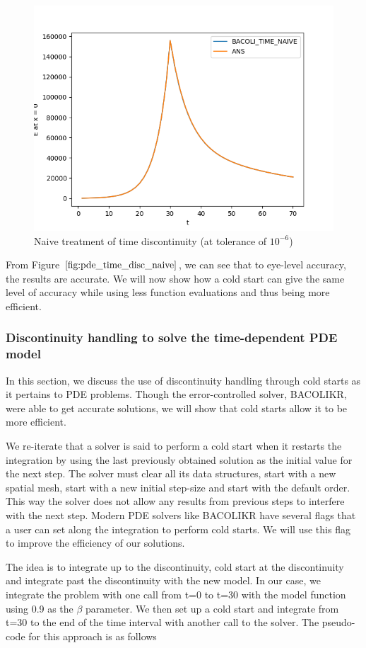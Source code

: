 \documentclass{article}
\begin{document}
\begin{figure}[H]
\centering
\includegraphics[width=0.7\linewidth]{./figures/pde_time_disc_naive}
\caption{Naive treatment of time discontinuity (at tolerance of $10^{-6}$)}
\label{fig:pde_time_disc_naive}
\end{figure}

From Figure $\ref{fig:pde_time_disc_naive}$, we can see that to eye-level accuracy, the results are accurate. We will now show how a cold start can give the same level of accuracy while using less function evaluations and thus being more efficient.

\subsubsection{Discontinuity handling to solve the time-dependent PDE model}
\label{subsubsection:pde_time_disc_hand}
In this section, we discuss the use of discontinuity handling through cold starts as it pertains to PDE problems. Though the error-controlled solver, BACOLIKR, were able to get accurate solutions, we will show that cold starts allow it to be more efficient.

We re-iterate that a solver is said to perform a cold start when it restarts the integration by using the last previously obtained solution as the initial value for the next step. The solver must clear all its data structures, start with a new spatial mesh, start with a new initial step-size and start with the default order. This way the solver does not allow any results from previous steps to interfere with the next step. Modern PDE solvers like BACOLIKR have several flags that a user can set along the integration to perform cold starts. We will use this flag to improve the efficiency of our solutions.

The idea is to integrate up to the discontinuity, cold start at the discontinuity and integrate past the discontinuity with the new model. In our case, we integrate the problem with one call from t=0 to t=30 with the model function using 0.9 as the $\beta$ parameter. We then set up a cold start and integrate from t=30 to the end of the time interval with another call to the solver. The pseudo-code for this approach is as follows
\end{document}
